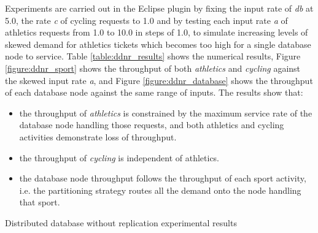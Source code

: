 \FloatBarrier
Experiments are carried out in the Eclipse plugin by fixing the input rate of {\itshape db} at 5.0, the rate {\itshape c} of cycling requests to 1.0 and by testing each input rate {\itshape a} of athletics requests from 1.0 to 10.0 in steps of 1.0, to simulate increasing levels of skewed demand for athletics tickets which becomes too high for a single database node to service.  Table \ref{table:ddnr_results} shows the numerical results, Figure \ref{figure:ddnr_sport} shows the throughput of both {\itshape athletics} and {\itshape cycling} against the skewed input rate {\itshape a}, and Figure \ref{figure:ddnr_database} shows the throughput of each database node against the same range of inputs.
The results show that:
\begin{itemize}
	\item the throughput of {\itshape athletics} is constrained by the maximum service rate of the database node handling those requests, and both athletics and cycling activities demonstrate loss of throughput.
	\item the throughput of {\itshape cycling} is independent of athletics.
	\item the database node throughput follows the throughput of each sport activity, i.e. the partitioning strategy routes all the demand onto the node handling that sport.
\end{itemize}

\begin{table}[h!]
	\centering
	\caption{Distributed database without replication experimental results}
	\label{table:ddnr_results}
\end{table}

